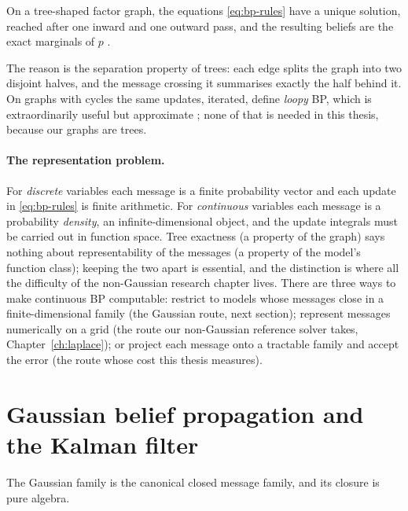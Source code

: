 \begin{theorem}\label{thm:tree-exact}
On a tree-shaped factor graph, the equations \eqref{eq:bp-rules} have a
unique solution, reached after one inward and one outward pass, and the
resulting beliefs are the exact marginals of $p$
\citep[Theorem~14.1]{mezard2009information}.
\end{theorem}

The reason is the separation property of trees: each edge splits the
graph into two disjoint halves, and the message crossing it summarises
exactly the half behind it. On graphs with cycles the same updates,
iterated, define \emph{loopy} BP, which is extraordinarily useful but
approximate \citep{weiss2001correctness, malioutov2006walk}; none of that
is needed in this thesis, because our graphs are trees.

\paragraph{The representation problem.} For \emph{discrete} variables
each message is a finite probability vector and each update in
\eqref{eq:bp-rules} is finite arithmetic. For \emph{continuous} variables
each message is a probability \emph{density}, an infinite-dimensional
object, and the update integrals must be carried out in function space.
Tree exactness (a property of the graph) says nothing about
representability of the messages (a property of the model's function
class); keeping the two apart is essential, and the distinction is where
all the difficulty of the non-Gaussian research chapter lives. There are
three ways to make continuous BP computable: restrict to models whose
messages close in a finite-dimensional family (the Gaussian route, next
section); represent messages numerically on a grid (the route our
non-Gaussian reference solver takes, Chapter~\ref{ch:laplace}); or
project each message onto a tractable family and accept the error (the
route whose cost this thesis measures).

\section{Gaussian belief propagation and the Kalman filter}
\label{sec:gaussian-bp}

The Gaussian family is the canonical closed message family, and its
closure is pure algebra.


